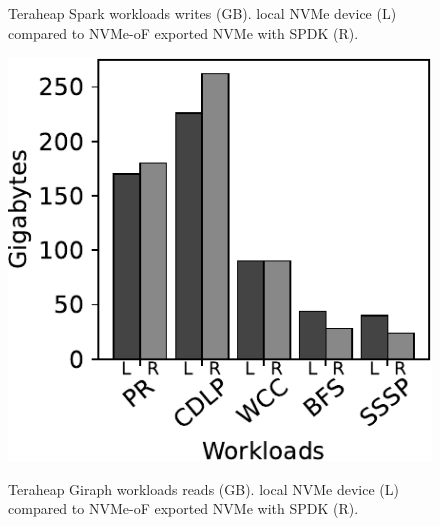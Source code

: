 {\begin{figure}[H]
\caption{Teraheap Spark workloads writes (GB). local NVMe device (L) compared to NVMe-oF exported NVMe with SPDK (R).}
\label{fig:spark_w}
\end{figure}
\vspace{10em}
\begin{figure}[H]
  \includegraphics[width=\linewidth]{figures/giraph_r.pdf}\\
\caption{Teraheap Giraph workloads reads (GB). local NVMe device (L) compared to NVMe-oF exported NVMe with SPDK (R).}
\label{fig:giraph_r}
\end{figure}

}
